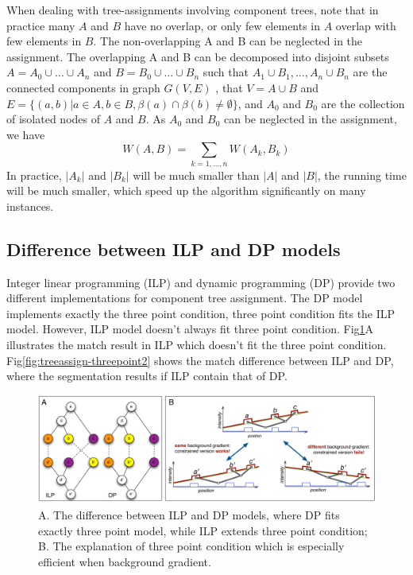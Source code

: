When dealing with tree-assignments involving component trees, note that in practice many $A$ and $B$ have no overlap, or only few elements in $A$ overlap with few elements in $B$. The non-overlapping A and B can be neglected in the assignment. The overlapping A and B can be decomposed into disjoint subsets $A=A_0 \cup \ldots \cup A_n$ and $B = B_0 \cup \ldots \cup B_n$ such that $A_1 \cup B_1, \ldots, A_n \cup B_n$ are the connected components in graph $G(V, E)$ , that $V = A \cup B$ and $E = \{(a,b)|a \in A, b \in B, \beta(a) \cap \beta(b) \neq \emptyset\}$,  and $A_0$ and $B_0$ are the collection of isolated nodes of $A$ and $B$. As $A_0$ and $B_0$ can be neglected in the assignment, we have 
\begin{equation*} \label{eqn:ldcp-decomp}
W(A,B) = \sum_{k=1,\ldots,n}{W(A_k, B_k)}
\end{equation*}
In practice, $|A_k|$ and $|B_k|$ will be much smaller than $|A|$ and $|B|$, the running time will be much smaller, which speed up the algorithm significantly on many instances.
\subsection{Difference between ILP and DP models}
Integer linear programming (ILP) and dynamic programming (DP) provide two different implementations for component tree assignment. The DP model implements exactly the three point condition, three point condition fits the ILP model. However, ILP model doesn't always fit three point condition. Fig\ref{fig:treeassign-threepoint}A illustrates the match result in ILP which doesn't fit the three point condition. Fig\ref{fig:treeassign-threepoint2} shows the match difference between ILP and DP, where the segmentation results if ILP contain that of DP.

\begin{figure}[htbp]
\centering
\includegraphics[width=1.0\textwidth]{images/treeassign_threepoint}
\caption[Three point condition]{A. The difference between ILP and DP models, where DP fits exactly three point model, while ILP extends three point condition; B. The explanation of three point condition which is especially efficient when background gradient.}
\label{fig:treeassign-threepoint}
\end{figure}

